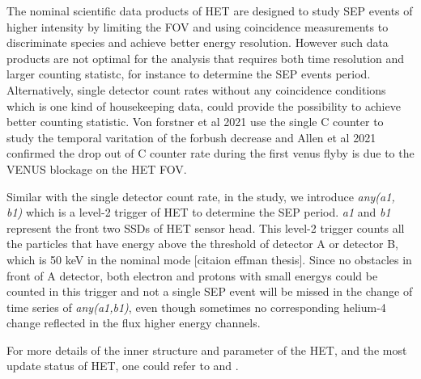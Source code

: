 The nominal scientific data products of HET are designed to study SEP events of higher intensity by limiting the FOV and using coincidence measurements to discriminate species and achieve better energy resolution. However such data products are not optimal for the analysis that requires both time resolution and larger counting statistc, for instance to determine the SEP events period.    Alternatively, single detector count rates without any coincidence conditions which is one kind of housekeeping data, could provide the possibility to achieve better counting statistic. Von forstner et al 2021 use the single C counter to study the temporal varitation of the forbush decrease and Allen et al 2021 confirmed the drop out of C counter rate during the first venus flyby is due to the VENUS blockage on the HET FOV.

Similar with the single detector count rate, in the study, we introduce \textit{any(a1, b1)} which is a level-2 trigger of HET to determine the SEP period. \textit{a1} and \textit{b1} represent the front two SSDs of HET sensor head. This level-2 trigger counts all the particles that have energy above the threshold of detector A or detector B, which is 50 keV in the nominal mode [citaion effman thesis]. Since no obstacles in front of A detector, both electron and protons with small energys could be counted in this trigger and not a single SEP event will be missed in the change of time series of \textit{any(a1,b1)}, even though sometimes no corresponding helium-4 change reflected in the flux higher energy channels.

For more details of the inner structure and parameter of the HET, and the most update status of HET, one could refer to \citep{2020AA_EPD} and \citep{wimmer2021AA}.




